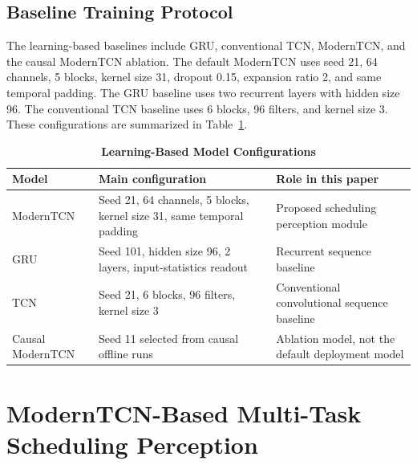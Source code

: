 \documentclass{ieeeaccess}
\begin{document}
\subsection{Baseline Training Protocol}

The learning-based baselines include GRU, conventional TCN, ModernTCN, and the causal ModernTCN ablation. The default ModernTCN uses seed 21, 64 channels, 5 blocks, kernel size 31, dropout 0.15, expansion ratio 2, and same temporal padding. The GRU baseline uses two recurrent layers with hidden size 96. The conventional TCN baseline uses 6 blocks, 96 filters, and kernel size 3. These configurations are summarized in Table~\ref{tab:model_configs}.

\begin{table}[!t]

\caption{\textbf{Learning-Based Model Configurations}}

\label{tab:model_configs}

\setlength{\tabcolsep}{3pt}

\begin{tabular}{|p{58pt}|p{75pt}|p{105pt}|}

\hline

Model & Main configuration & Role in this paper \\

\hline

ModernTCN & Seed 21, 64 channels, 5 blocks, kernel size 31, same temporal padding & Proposed scheduling perception module \\

GRU & Seed 101, hidden size 96, 2 layers, input-statistics readout & Recurrent sequence baseline \\

TCN & Seed 21, 6 blocks, 96 filters, kernel size 3 & Conventional convolutional sequence baseline \\

Causal ModernTCN & Seed 11 selected from causal offline runs & Ablation model, not the default deployment model \\

\hline

\end{tabular}

\end{table}

\section{ModernTCN-Based Multi-Task Scheduling Perception}
\end{document}
